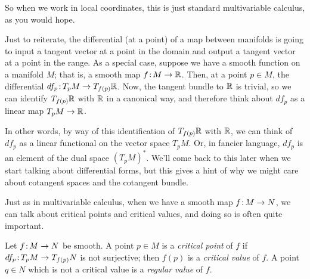 So when we work in local coordinates, this is just standard multivariable calculus, as you would hope.

Just to reiterate, the differential (at a point) of a map between manifolds is going to input a tangent vector at a point in the domain and output a tangent vector at a point in the range. As a special case, suppose we have a smooth function on a manifold $M$; that is, a smooth map $f \colon\thinspace\!\! M \to \mathbb{R}$. Then, at a point $p \in M$, the differential $df_p \colon\thinspace\!\! T_p M \to T_{f(p)}\mathbb{R}$. Now, the tangent bundle to $\mathbb{R}$ is trivial, so we can identify $T_{f(p)}\mathbb{R}$ with $\mathbb{R}$ in a canonical way, and therefore think about $df_p$ as a linear map $T_pM \to \mathbb{R}$.

In other words, by way of this identification of $T_{f(p)} \mathbb{R}$ with $\mathbb{R}$, we can think of $df_p$ as a linear functional on the vector space $T_pM$. Or, in fancier language, $df_p$ is an element of the dual space $\left(T_pM\right)^\ast$. We'll come back to this later when we start talking about differential forms, but this gives a hint of why we might care about cotangent spaces and the cotangent bundle.

Just as in multivariable calculus, when we have a smooth map $f \colon\thinspace\!\! M \to N$, we can talk about critical points and critical values, and doing so is often quite important.

\begin{definition}\label{def:critical points}
	Let $f \colon\thinspace\!\! M \to N$ be smooth. A point $p \in M$ is a \emph{critical point} of $f$ if $df_p\colon\thinspace\!\! T_p M \to T_{f(p)}N$ is not surjective; then $f(p)$ is a \emph{critical value} of $f$. A point $q \in N$ which is not a critical value is a \emph{regular value} of $f$.
\end{definition}

